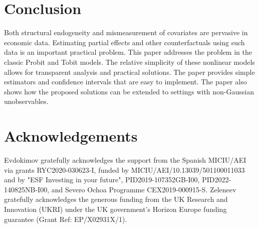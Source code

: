 \documentclass[12pt]{article}
\begin{document}
\bigskip

\section{Conclusion}

Both structural endogeneity and mismeasurement of covariates are pervasive
in economic data. Estimating partial effects and other counterfactuals using
such data is an important practical problem. This paper addresses the
problem in the classic Probit and Tobit models. The relative simplicity of
these nonlinear models allows for transparent analysis and practical
solutions. The paper provides simple estimators and confidence intervals
that are easy to implement. The paper also shows how the proposed solutions
can be extended to settings with non-Gaussian unobservables.

\bigskip
\bigskip

\section*{Acknowledgements}
Evdokimov gratefully acknowledges the support from the Spanish MICIU/AEI via grants RYC2020-030623-I, funded by MICIU/AEI/10.13039/501100011033 and by "ESF Investing in your future", PID2019-107352GB-I00, PID2022-140825NB-I00, and Severo Ochoa Programme CEX2019-000915-S. Zeleneev gratefully acknowledges the generous funding from the UK Research and Innovation (UKRI) under the UK government’s Horizon Europe funding
guarantee (Grant Ref: EP/X02931X/1).

\bigskip




\bigskip
\end{document}
